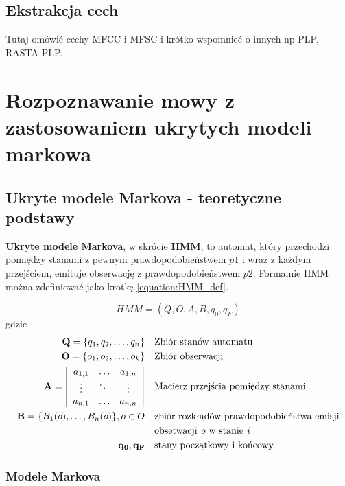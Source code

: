 \documentclass[11pt]{article}
\begin{document}
	\subsection{ Ekstrakcja cech }
	Tutaj omówić cechy MFCC i MFSC i krótko wspomnieć o innych np PLP, RASTA-PLP.
	

\section {Rozpoznawanie mowy z zastosowaniem ukrytych modeli markowa}
	\label{sec:ASR_HMM}
    \subsection{Ukryte modele Markova - teoretyczne podstawy}
    
	    \textbf{Ukryte modele Markova}, w skrócie \textbf{HMM}, to automat, który przechodzi pomiędzy stanami z pewnym prawdopodobieństwem $p1$ i wraz z każdym przejściem, emituje obserwację z prawdopodobieństwem $p2$. Formalnie HMM można zdefiniować jako krotkę \ref{equation:HMM_def}.
	    
	    \begin{equation}
		    HMM = (Q, O, A, B, q_0, q_F)
		    \label{equation:HMM_def}
	    \end{equation}
	    gdzie
	    \begin{align*}
		    \mathbf{Q}=\{q_1, q_2,\ldots,q_n\} & &&  \text{Zbiór stanów automatu} \\
	 	    \mathbf{O}=\{o_1, o_2,\ldots,o_k\} & &&  \text{Zbiór obserwacji} \\
	 	    \mathbf{A} =
	 	    \left| \begin{array}{ccc}
		 	    a_{1,1} & \ldots & a_{1,n} \\
		 	    \vdots  & \ddots & \vdots\\
		 	    a_{n,1} & \ldots & a_{n,n}
	 	    \end{array} \right|
	 	    & &&  \text{Macierz przejścia pomiędzy stanami} \\
	 	    \mathbf{B}=\{B_1(o),\ldots,B_n(o)\},o \in O & && \text{zbiór rozkłądów prawdopodobieństwa emisji} \\ 
													 	& && \text{obsetwacji \textit{o} w stanie \textit{i}} \\
		 	\mathbf{q_0, q_F}				  & && \text{stany początkowy i końcowy}
	    \end{align*}
	    
    	
	    	
	   \subsubsection{Modele Markova}
\end{document}

